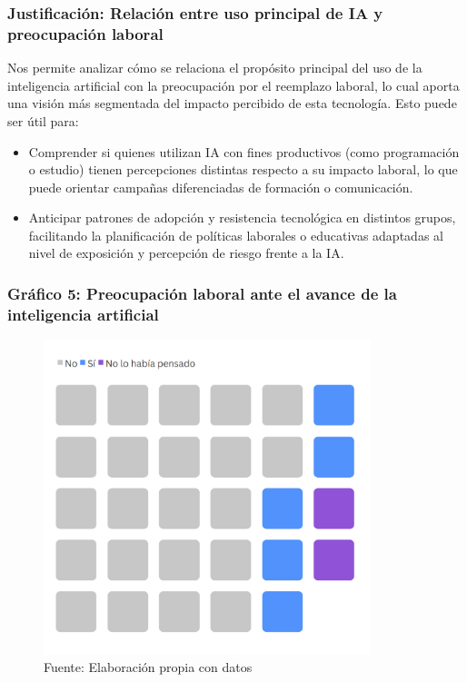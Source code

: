 \documentclass[12pt, a4paper]{article}
\begin{document}
\subsubsection*{Justificación: Relación entre uso principal de IA y preocupación laboral}
Nos permite analizar cómo se relaciona el propósito principal del uso de la inteligencia artificial con la preocupación por el reemplazo laboral, lo cual aporta una visión más segmentada del impacto percibido de esta tecnología. Esto puede ser útil para:
\begin{itemize}
    \item Comprender si quienes utilizan IA con fines productivos (como programación o estudio) tienen percepciones distintas respecto a su impacto laboral, lo que puede orientar campañas diferenciadas de formación o comunicación.
    \item Anticipar patrones de adopción y resistencia tecnológica en distintos grupos, facilitando la planificación de políticas laborales o educativas adaptadas al nivel de exposición y percepción de riesgo frente a la IA.
\end{itemize}

\subsubsection*{Gráfico 5: Preocupación laboral ante el avance de la inteligencia artificial}
\begin{figure}[H]
    \centering
    \includegraphics[width=0.85\textwidth]{Graficos/PreocupacionLaboral.jpg}
    \caption[5]{Fuente: Elaboración propia con datos}
\end{figure}
\end{document}
